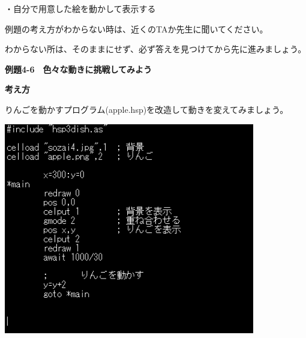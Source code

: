 \documentclass[a4paper,dvipdfmx]{jarticle}
\newcommand\textstyleqwerty[1]{#1}
\begin{document}
・自分で用意した絵を動かして表示する


\bigskip

例題の考え方がわからない時は、近くのTAか先生に聞いてください。

わからない所は、そのままにせず、必ず答えを見つけてから先に進みましょう。


\bigskip


\bigskip


\bigskip


\bigskip


\bigskip


\bigskip


\bigskip


\bigskip


\bigskip

\clearpage
\textstyleqwerty{\textbf{例題4-6　色々な動きに挑戦してみよう}}


\bigskip

{\bfseries
考え方}


\bigskip

りんごを動かすプログラム(apple.hsp)を改造して動きを変えてみましょう。


\bigskip



\begin{center}
\includegraphics[width=10.954cm,height=9.213cm]{text04-img/text04-img020.png}

\end{center}

\bigskip


\bigskip


\bigskip
\end{document}
